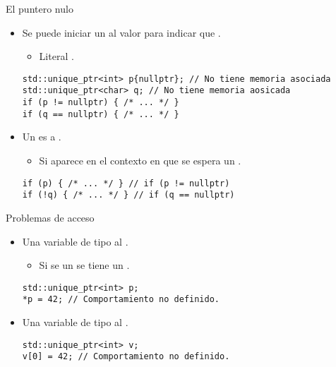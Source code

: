 \begin{frame}[t,fragile]{El puntero nulo}
\begin{itemize}
  \item Se puede iniciar un  al valor 
         para indicar 
        que .
    \begin{itemize}
      \item Literal .
    \end{itemize}
\begin{lstlisting}
std::unique_ptr<int> p{nullptr}; // No tiene memoria asociada
std::unique_ptr<char> q; // No tiene memoria aosicada
if (p != nullptr) { /* ... */ }
if (q == nullptr) { /* ... */ }
\end{lstlisting}

  \item Un  es  
        a .
    \begin{itemize}
      \item Si aparece en el contexto en que se espera un .
    \end{itemize}
\begin{lstlisting}
if (p) { /* ... */ } // if (p != nullptr) 
if (!q) { /* ... */ } // if (q == nullptr)
\end{lstlisting}
\end{itemize}
\end{frame}

\begin{frame}[t,fragile]{Problemas de acceso}
\begin{itemize}
  \item Una variable de tipo  
         al .
    \begin{itemize}
      \item Si se  un  se tiene un 
            .
    \end{itemize}
\begin{lstlisting}
std::unique_ptr<int> p;
*p = 42; // Comportamiento no definido.
\end{lstlisting}

  \item Una variable de tipo 
         al .
\begin{lstlisting}
std::unique_ptr<int> v;
v[0] = 42; // Comportamiento no definido.
\end{lstlisting}
\end{itemize}
\end{frame}


